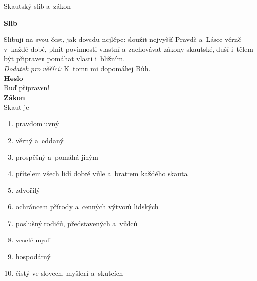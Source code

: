 \documentclass[hyperref={bookmarks=true, unicode=true, colorlinks=true, plainpages=false, pdfkeywords={Skaut, Junak, Skauting, Vychovna metoda}, linkcolor=OrangeRed, anchorcolor=OrangeRed, citecolor=RawSienna, filecolor=RawSienna, menucolor=OrangeRed, urlcolor=RawSienna, pdftex}, compress, xelatex, xcolor=dvipsnames, print]{beamer}
\begin{document}
\begin{frame}{Skautský slib a~zákon}
\begin{multicols}{3}
\textbf{Slib}

Slibuji na svou čest, jak dovedu nejlépe: sloužit nejvyšší Pravdě a~Lásce věrně v~každé době, plnit povinnosti vlastní a~zachovávat zákony skautské, duší i~tělem být připraven pomáhat vlasti i~bližním.\\
\textit{Dodatek pro věřící:} K~tomu mi dopomáhej Bůh.\\
\columnbreak
\textbf{Heslo}\\ Buď připraven!\\
\vfil
\textbf{Zákon}\\
Skaut je
\begin{enumerate}
 \item pravdomluvný
 \item věrný a~oddaný
 \item prospěšný a~pomáhá jiným
 \item přítelem všech lidí dobré vůle a~bratrem každého skauta
\end{enumerate}
\columnbreak
\begin{enumerate}
 \setcounter{enumi}{4}
 \item zdvořilý
 \item ochráncem přírody a~cenných výtvorů lidských
 \item poslušný rodičů, představených a~vůdců
 \item veselé mysli
 \item hospodárný
 \item čistý ve slovech, myšlení a~skutcích
\end{enumerate}
\end{multicols}
\end{frame}
\end{document}
